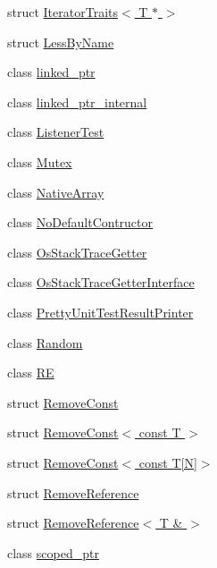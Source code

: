 \begin{DoxyCompactItemize}
struct \hyperlink{structtesting_1_1internal_1_1_iterator_traits_3_01_t_01_5_01_4}{Iterator\+Traits$<$ T $\ast$ $>$}
\item 
struct \hyperlink{structtesting_1_1internal_1_1_less_by_name}{Less\+By\+Name}
\item 
class \hyperlink{classtesting_1_1internal_1_1linked__ptr}{linked\+\_\+ptr}
\item 
class \hyperlink{classtesting_1_1internal_1_1linked__ptr__internal}{linked\+\_\+ptr\+\_\+internal}
\item 
class \hyperlink{classtesting_1_1internal_1_1_listener_test}{Listener\+Test}
\item 
class \hyperlink{classtesting_1_1internal_1_1_mutex}{Mutex}
\item 
class \hyperlink{classtesting_1_1internal_1_1_native_array}{Native\+Array}
\item 
class \hyperlink{classtesting_1_1internal_1_1_no_default_contructor}{No\+Default\+Contructor}
\item 
class \hyperlink{classtesting_1_1internal_1_1_os_stack_trace_getter}{Os\+Stack\+Trace\+Getter}
\item 
class \hyperlink{classtesting_1_1internal_1_1_os_stack_trace_getter_interface}{Os\+Stack\+Trace\+Getter\+Interface}
\item 
class \hyperlink{classtesting_1_1internal_1_1_pretty_unit_test_result_printer}{Pretty\+Unit\+Test\+Result\+Printer}
\item 
class \hyperlink{classtesting_1_1internal_1_1_random}{Random}
\item 
class \hyperlink{classtesting_1_1internal_1_1_r_e}{R\+E}
\item 
struct \hyperlink{structtesting_1_1internal_1_1_remove_const}{Remove\+Const}
\item 
struct \hyperlink{structtesting_1_1internal_1_1_remove_const_3_01const_01_t_01_4}{Remove\+Const$<$ const T $>$}
\item 
struct \hyperlink{structtesting_1_1internal_1_1_remove_const_3_01const_01_t[_n]_4}{Remove\+Const$<$ const T\mbox{[}\+N\mbox{]}$>$}
\item 
struct \hyperlink{structtesting_1_1internal_1_1_remove_reference}{Remove\+Reference}
\item 
struct \hyperlink{structtesting_1_1internal_1_1_remove_reference_3_01_t_01_6_01_4}{Remove\+Reference$<$ T \& $>$}
\item 
class \hyperlink{classtesting_1_1internal_1_1scoped__ptr}{scoped\+\_\+ptr}
\item 

\end{DoxyCompactItemize}
